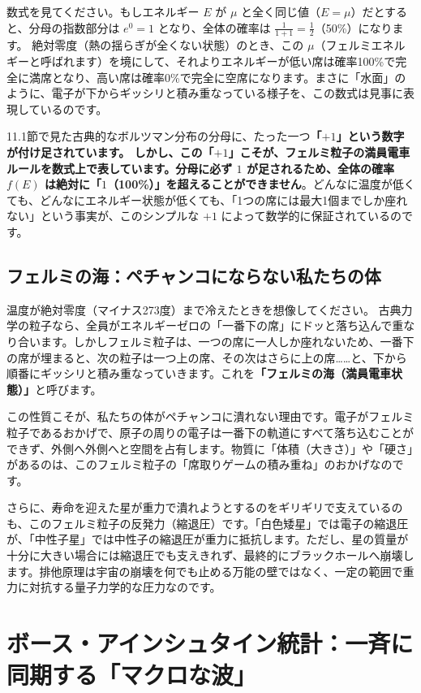 数式を見てください。もしエネルギー \(E\) が \(\mu\) と全く同じ値（\(E = \mu\)）だとすると、分母の指数部分は \(e^{0} = 1\) となり、全体の確率は \(\frac{1}{1+1} = \frac{1}{2}\)（50\%）になります。 絶対零度（熱の揺らぎが全くない状態）のとき、この \(\mu\)（フェルミエネルギーと呼ばれます）を境にして、それよりエネルギーが低い席は確率100\%で完全に満席となり、高い席は確率0\%で完全に空席になります。まさに「水面」のように、電子が下からギッシリと積み重なっている様子を、この数式は見事に表現しているのです。

11.1節で見た古典的なボルツマン分布の分母に、たった一つ\textbf{「\(+1\)」という数字が付け足されています。 しかし、この「\(+1\)」こそが、フェルミ粒子の満員電車ルールを数式上で表しています。分母に必ず \(1\) が足されるため、全体の確率 \(f(E)\) は絶対に「\(1\)（100\%）」を超えることができません}。どんなに温度が低くても、どんなにエネルギー状態が低くても、「1つの席には最大1個までしか座れない」という事実が、このシンプルな \(+1\) によって数学的に保証されているのです。

\subsection{フェルミの海：ペチャンコにならない私たちの体}

温度が絶対零度（マイナス273度）まで冷えたときを想像してください。 古典力学の粒子なら、全員がエネルギーゼロの「一番下の席」にドッと落ち込んで重なり合います。しかしフェルミ粒子は、一つの席に一人しか座れないため、一番下の席が埋まると、次の粒子は一つ上の席、その次はさらに上の席\ldots{}\ldots{}と、下から順番にギッシリと積み重なっていきます。これを\textbf{「フェルミの海（満員電車状態）」}と呼びます。

この性質こそが、私たちの体がペチャンコに潰れない理由です。電子がフェルミ粒子であるおかげで、原子の周りの電子は一番下の軌道にすべて落ち込むことができず、外側へ外側へと空間を占有します。物質に「体積（大きさ）」や「硬さ」があるのは、このフェルミ粒子の「席取りゲームの積み重ね」のおかげなのです。

さらに、寿命を迎えた星が重力で潰れようとするのをギリギリで支えているのも、このフェルミ粒子の反発力（縮退圧）です。「白色矮星」では電子の縮退圧が、「中性子星」では中性子の縮退圧が重力に抵抗します。ただし、星の質量が十分に大きい場合には縮退圧でも支えきれず、最終的にブラックホールへ崩壊します。排他原理は宇宙の崩壊を何でも止める万能の壁ではなく、一定の範囲で重力に対抗する量子力学的な圧力なのです。

\section{ボース・アインシュタイン統計：一斉に同期する「マクロな波」}

